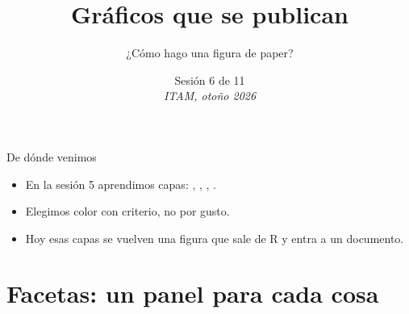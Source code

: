 %



\title[Lab de R · Sesión 6]{Gráficos que se publican}
\subtitle{¿Cómo hago una figura de paper?}
\date{%
  Sesión 6 de 11\\[0.3em]
  \textit{ITAM, otoño 2026}%
}



{
\begin{frame}
  \titlepage
\end{frame}}


\begin{frame}{De dónde venimos}
  \vspace{0.3em}
  \begin{itemize}\setlength{\itemsep}{0.9em}
    \item<1-> En la sesión 5 aprendimos capas: , ,
          , .
    \item<2-> Elegimos color con criterio, no por gusto.
    \item<3-> Hoy esas capas se vuelven una figura que sale de R y entra a
          un documento.
  \end{itemize}
\end{frame}

\section{Facetas: un panel para cada cosa}

